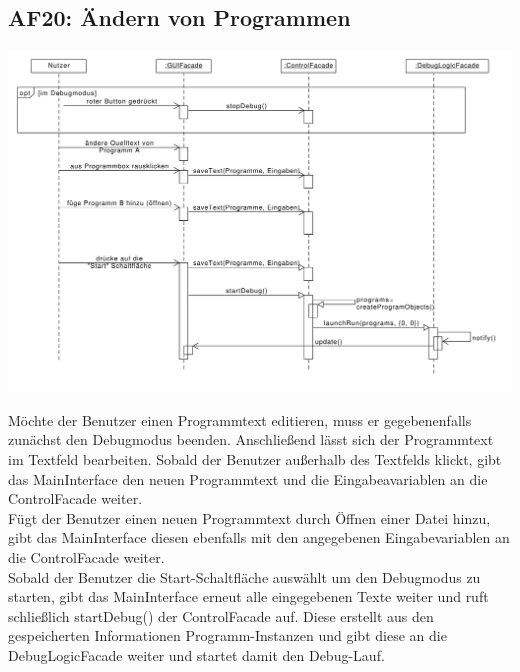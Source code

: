 \documentclass[parskip=full]{scrartcl}
\begin{document}
\subsection{AF20: Ändern von Programmen}
\begin{center}
\includegraphics[width=1.0\textwidth]{diagrammIdeenUmlet/SequenceDiagrams/seq_AF20PDF.pdf}
\end{center}
Möchte der Benutzer einen Programmtext editieren, muss er gegebenenfalls zunächst den Debugmodus beenden.
Anschließend lässt sich der Programmtext im Textfeld bearbeiten. Sobald der Benutzer außerhalb des
Textfelds klickt, gibt das MainInterface den neuen Programmtext und die Eingabeavariablen an die ControlFacade weiter. \\
Fügt der Benutzer einen neuen Programmtext durch Öffnen einer Datei hinzu, gibt das MainInterface diesen ebenfalls
mit den angegebenen Eingabevariablen an die ControlFacade weiter.\\
Sobald der Benutzer die Start-Schaltfläche auswählt um den Debugmodus zu starten, gibt das MainInterface erneut
alle eingegebenen Texte weiter und ruft schließlich startDebug() der ControlFacade auf. Diese erstellt aus den gespeicherten Informationen
Programm-Instanzen und gibt diese an die DebugLogicFacade weiter und startet damit den Debug-Lauf.

\newpage
\end{document}
